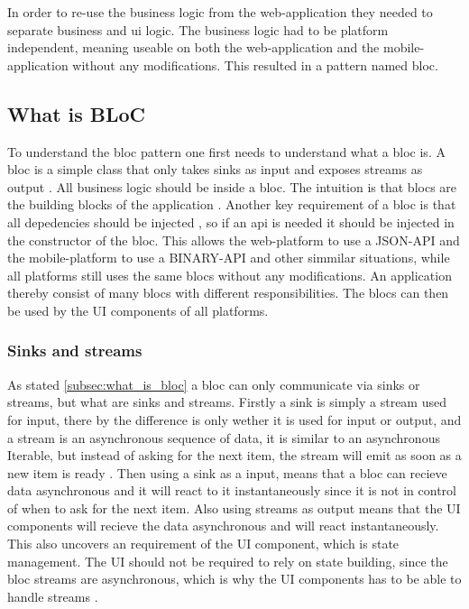 In order to re-use the business logic from the web-application they needed to separate business and \gls{ui} logic. The business logic had to be platform independent, meaning useable on both the web-application and the mobile-application without any modifications\cite[2 min 12 sec]{blocPattern}. This resulted in a pattern named \gls{bloc}.

\subsection{What is BLoC} \label{subsec:what_is_bloc}
To understand the \gls{bloc} pattern one first needs to understand what a \gls{bloc} is. A \gls{bloc} is a simple class that only takes sinks as input and exposes streams as output \cite[21 min 25 sec]{blocPattern}. All business logic should be inside a \gls{bloc}. The intuition is that \glspl{bloc} are the building blocks of the application \cite[21 min 25 sec]{blocPattern}. Another key requirement of a \gls{bloc} is that all depedencies should be injected \cite[22 min 55 sec]{blocPattern}, so if an api is needed it should be injected in the constructor of the \gls{bloc}. This allows the web-platform to use a JSON-API and the mobile-platform to use a BINARY-API and other simmilar situations, while all platforms still uses the same \glspl{bloc} without any modifications. An application thereby consist of many \glspl{bloc} with different responsibilities. The \glspl{bloc} can then be used by the UI components of all platforms.

\subsubsection{Sinks and streams}
As stated \autoref{subsec:what_is_bloc} a \gls{bloc} can only communicate via sinks or streams, but what are sinks and streams. Firstly a sink is simply a stream used for input, there by the difference is only wether it is used for input or output, and a stream is an asynchronous sequence of data, it is similar to an asynchronous Iterable, but instead of asking for the next item, the stream will emit as soon as a new item is ready \cite{dartStreams}. Then using a sink as a input, means that a \gls{bloc} can recieve data asynchronous and it will react to it instantaneously since it is not in control of when to ask for the next item. Also using streams as output means that the UI components will recieve the data asynchronous and will react instantaneously. This also uncovers an requirement of the UI component, which is state management. The UI should not be required to rely on state building, since the \gls{bloc} streams are asynchronous, which is why the UI components has to be able to handle streams \cite[4 min 40 sec \& 14min 00 sec]{blocPattern}.

